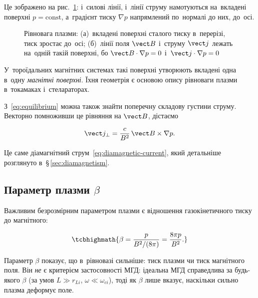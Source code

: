 Це зображено на рис.~\ref{pic:mhd-equilibrium}: і~силові лінії, і~лінії струму намотуються на~вкладені
поверхні $p=\mathrm{const}$, а~градієнт тиску $\nabla p$ напрямлений по~нормалі до них, до~осі.

\begin{figure}[ht]
    \centering
    \caption{Рівновага плазми: (а)~вкладені поверхні сталого тиску в~перерізі, тиск зростає до~осі;
    (б)~лінії поля $\vect B$ і~струму $\vect j$ лежать на~одній такій поверхні, бо $\vect B\cdot\nabla p=0$ і~$\vect j\cdot\nabla p=0$}
    \label{pic:mhd-equilibrium}
\end{figure}

У~тороїдальних магнітних системах такі поверхні утворюють вкладені одна в~одну
\emph{магнітні поверхні}. Їхня геометрія є основою опису рівноваги плазми в~токамаках
і~стелараторах.

З~\eqref{eq:equilibrium} можна також знайти поперечну складову густини струму. Векторно
помноживши це рівняння на $\vect B$, дістаємо

\begin{equation*}
    \vect j_\perp
    =
    \frac{c}{B^2}\,
    \vect B\times\nabla p.
\end{equation*}

Це саме діамагнітний струм~\eqref{eq:diamagnetic-current}, який детальніше розглянуто в~§\,\ref{sec:diamagnetism}.


\subsection*{Параметр плазми \texorpdfstring{$\beta$}{beta}}


Важливим безрозмірним параметром плазми є відношення газокінетичного тиску до магнітного:

\begin{equation}\label{eq:beta}
    \tcbhighmath{
    \beta
    =
    \frac{p}{B^2/(8\pi)}
    =
    \frac{8\pi p}{B^2}.
    }
\end{equation}

Параметр $\beta$ показує, що в~рівновазі сильніше: тиск плазми чи тиск магнітного поля. Він \emph{не} є критерієм застосовності МГД: ідеальна МГД справедлива за будь-якого
$\beta$ (за умов $L\gg r_{Li}$, $\omega\ll\omega_{ci}$), тоді як $\beta$ лише вказує, наскільки
сильно плазма деформує поле.

